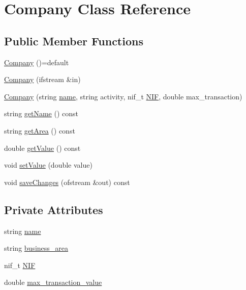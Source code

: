 \hypertarget{class_company}{}\section{Company Class Reference}
\label{class_company}
\subsection*{Public Member Functions}
\begin{DoxyCompactItemize}
\item 
\hyperlink{class_company_a14c30a07bc6ce43b9a8e16415ab826e9}{Company} ()=default
\item 
\hyperlink{class_company_a0e6ef245a534b48cdb0c51cd66999455}{Company} (ifstream \&in)
\item 
\hyperlink{class_company_abbf74930e92c0b9faa7a73939bbde5bf}{Company} (string \hyperlink{class_company_afe7bfcfc179e962e871f99ff69dbce74}{name}, string activity, nif\+\_\+t \hyperlink{class_company_a0d65a4cc7270c8dcc77c61197d754bf8}{N\+IF}, double max\+\_\+transaction)
\item 
string \hyperlink{class_company_a4a45565d61c119cb590383553bc327d1}{get\+Name} () const
\item 
string \hyperlink{class_company_a0c658ce5f8f44128bc956a3a1b109cf4}{get\+Area} () const
\item 
double \hyperlink{class_company_ac58564060524572039b49fe2ccda5f22}{get\+Value} () const
\item 
void \hyperlink{class_company_ac3ac784557289240512046b43bac21e6}{set\+Value} (double value)
\item 
void \hyperlink{class_company_a9ddf44ce09b2f41b03e7feb28153f376}{save\+Changes} (ofstream \&out) const
\end{DoxyCompactItemize}
\subsection*{Private Attributes}
\begin{DoxyCompactItemize}
\item 
string \hyperlink{class_company_afe7bfcfc179e962e871f99ff69dbce74}{name}
\item 
string \hyperlink{class_company_ad67f44dc8c88152cb2f896b13a56fae5}{business\+\_\+area}
\item 
nif\+\_\+t \hyperlink{class_company_a0d65a4cc7270c8dcc77c61197d754bf8}{N\+IF}
\item 
double \hyperlink{class_company_a41137e8ae797c21fc22ea97ef8c3a4fb}{max\+\_\+transaction\+\_\+value}
\end{DoxyCompactItemize}
